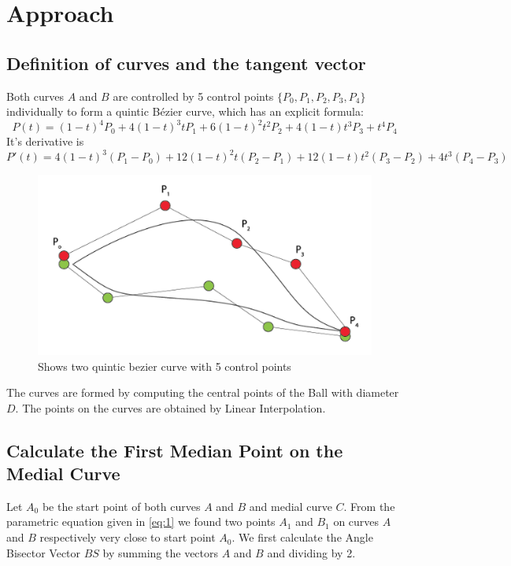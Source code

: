 \documentclass[twoside,11pt]{article}
\begin{document}
\section{Approach}
\subsection{Definition of curves and the tangent vector}
Both curves $A$ and $B$ are controlled by 5 control points  $\{P_0, P_1, P_2, P_3, P_4\}$ individually to form a quintic B\'ezier curve, which has an explicit formula:
\begin{equation}
  \label{eq:1}
  P(t) = (1-t)^4 P_0 + 4(1-t)^3t P_1 + 6(1-t)^2 t^2 P_2 + 4(1-t)t^3 P_3 + t^4 P_4 
\end{equation}
It's derivative is 
\begin{equation}
  \label{eq:2}
  P'(t) = 4(1-t)^3 (P_1 - P_0) + 12(1-t)^2t (P_2 - P_1) + 12(1-t)t^2 (P_3 - P_2) + 4t^3(P_4 - P_3)
\end{equation}

\begin{figure} [t]
    \centering
    \includegraphics[width=06in]{twoCurves.png}
    \caption{Shows two quintic bezier curve with 5 control points}
\end{figure}

The curves are formed by computing the central points of the Ball with diameter $D$. The points on the curves are obtained by Linear Interpolation.

\subsection{Calculate the First Median Point on the Medial Curve}

Let $A_0$ be the start point of both curves $A$ and $B$ and  medial curve $C$. From the parametric equation given in \ref{eq:1} we found two points $A_1$ and $B_1$ on curves $A$ and $B$ respectively very close to start point $A_0$.
We first calculate the Angle Bisector Vector $BS$ by summing the vectors $A$ and $B$ and dividing by 2.
\end{document}
